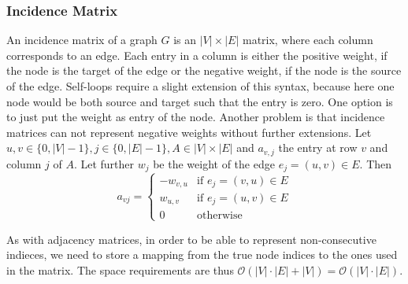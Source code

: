         \subsubsection*{Incidence Matrix}
        An incidence matrix of a graph $G$ is an $|V| \times |E|$ matrix, where each column corresponds to an edge. Each entry in a column is either the positive weight, if the node is the target of the edge or the negative weight, if the node is the source of the edge. Self-loops require a slight extension of this syntax, because here one node would be both source and target such that the entry is zero. One option is to just put the weight as entry of the node.  Another problem is that incidence matrices can not represent negative weights without further extensions.        
        Let $u,v \in \{0, |V|-1\}, j \in \{0, |E|-1\}, A \in |V| \times |E|$ and $a_{v,j}$ the entry at row $v$ and column $j$ of $A$. Let further $w_j$ be the weight of the edge $e_j = (u,v) \in E$. Then 
        \[         a_{vj} = \begin{cases}
                     -w_{v,u} & \text{if } e_j = (v,u) \in E \\
                     w_{u,v} & \text{if } e_j = (u,v) \in E \\
                     0 & \text{otherwise}
                    \end{cases}
        \]
        
        As with adjacency matrices, in order to be able to represent non-consecutive indieces, we need to store a mapping from the true node indices to the ones used in the matrix.
        The space requirements are thus $\mathcal{O}(|V| \cdot |E| + |V|) = \mathcal{O}(|V| \cdot |E|)$. \\
        
